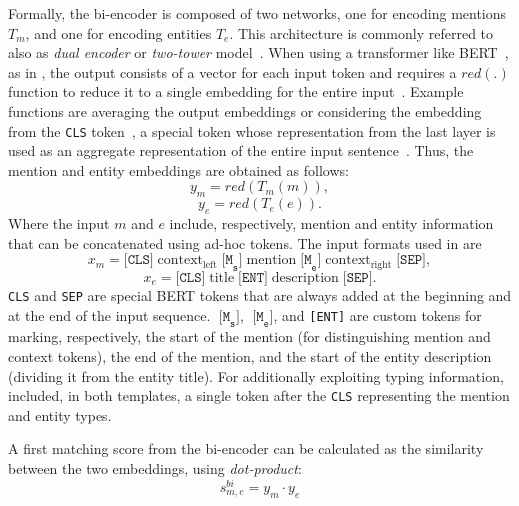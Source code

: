 Formally, the bi-encoder is composed of two networks, one for encoding mentions $T_m$, and one for encoding entities $T_e$.
This architecture is commonly referred to also as \emph{dual encoder} or \emph{two-tower} model~\cite{gillick-etal-2019-learning}.
When using a transformer like BERT~\cite{devlin-etal-2019-bert}, as in \textcite{blink}, the output consists of a vector for each input token and requires a $red(.)$ function to reduce it to a single embedding for the entire input~\cite{blink,Humeau2020Poly-encoders}. Example functions are averaging the output embeddings or considering the embedding from the \texttt{CLS} token~\cite{Humeau2020Poly-encoders}, \ie a special token whose representation from the last layer is used as an aggregate representation of the entire input sentence~\cite{devlin-etal-2019-bert}.
Thus, the mention and entity embeddings are obtained as follows:
\begin{equation}
    y_m = red(T_m(m)),
\end{equation}
\begin{equation}
    y_e = red(T_e(e)).
\end{equation}
Where the input $m$ and $e$ include, respectively, mention and entity information that can be concatenated using ad-hoc tokens. The input formats used in \textcite{blink} are
\begin{equation}
    x_m = \texttt{[CLS]} \;\text{context}_{\text{left}} \;\texttt{[M}_\texttt{s}\texttt{]} \;\text{mention} \;\texttt{[M}_\texttt{e}\texttt{]} \;\text{context}_{\text{right}} \;\texttt{[SEP]},
\end{equation}
\begin{equation}
    x_e = \texttt{[CLS]} \;\text{title} \;\texttt{[ENT]} \;\text{description} \;\texttt{[SEP]}.
\end{equation}
\texttt{CLS} and \texttt{SEP} are special BERT tokens that are always added at the beginning and at the end of the input sequence. $\;\texttt{[M}_\texttt{s}\texttt{]}$, $\;\texttt{[M}_\texttt{e}\texttt{]}$, and \texttt{[ENT]} are custom tokens for marking, respectively, the start of the mention (for distinguishing mention and context tokens), the end of the mention, and the start of the entity description (dividing it from the entity title).
For additionally exploiting typing information, \textcite{Heist2023nastylinker} included, in both templates, a single token after the \texttt{CLS} representing the mention and entity types.

A first matching score from the bi-encoder can be calculated as the similarity between the two embeddings, \eg using \emph{dot-product}:
\begin{equation}
s^{bi}_{m,e} = y_m \cdot y_e
\end{equation}

